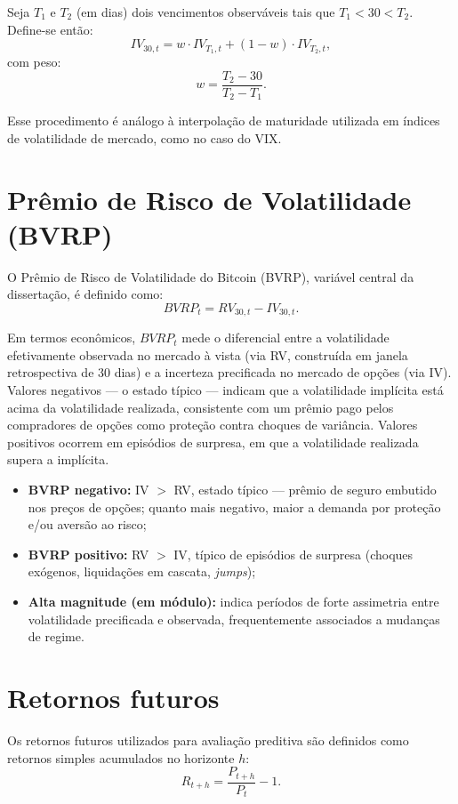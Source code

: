 Seja $T_1$ e $T_2$ (em dias) dois vencimentos observáveis tais que $T_1 < 30 < T_2$.
Define-se então:
\[
IV_{30,t} = w \cdot IV_{T_1,t} + (1-w)\cdot IV_{T_2,t},
\]
com peso:
\[
w = \frac{T_2 - 30}{T_2 - T_1}.
\]

Esse procedimento é análogo à interpolação de maturidade utilizada em índices de
volatilidade de mercado, como no caso do VIX.

\section{Prêmio de Risco de Volatilidade (BVRP)}

O Prêmio de Risco de Volatilidade do Bitcoin (BVRP), variável central da dissertação,
é definido como:
\[
BVRP_t = RV_{30,t} - IV_{30,t}.
\]

Em termos econômicos, $BVRP_t$ mede o diferencial entre a volatilidade
efetivamente observada no mercado à vista (via RV, construída em janela
retrospectiva de 30 dias) e a incerteza precificada no mercado de opções
(via IV). Valores negativos --- o estado típico --- indicam que a volatilidade
implícita está acima da volatilidade realizada, consistente com um prêmio pago
pelos compradores de opções como proteção contra choques de variância. Valores
positivos ocorrem em episódios de surpresa, em que a volatilidade realizada
supera a implícita.

\begin{itemize}
    \item \textbf{BVRP negativo:} IV $>$ RV, estado típico --- prêmio de seguro
    embutido nos preços de opções; quanto mais negativo, maior a demanda por
    proteção e/ou aversão ao risco;
    \item \textbf{BVRP positivo:} RV $>$ IV, típico de episódios de surpresa
    (choques exógenos, liquidações em cascata, \textit{jumps});
    \item \textbf{Alta magnitude (em módulo):} indica períodos de forte assimetria
    entre volatilidade precificada e observada, frequentemente associados a
    mudanças de regime.
\end{itemize}

\section{Retornos futuros}

Os retornos futuros utilizados para avaliação preditiva são definidos como retornos
simples acumulados no horizonte $h$:
\[
R_{t+h} = \frac{P_{t+h}}{P_t} - 1.
\]


